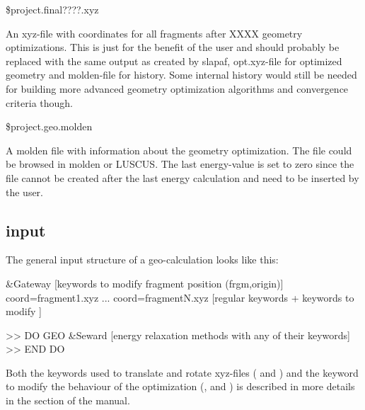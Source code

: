 \begin{filelist}
\item[\$project.final????.xyz]

An xyz-file with coordinates for all fragments after XXXX geometry optimizations.
 This is just for the benefit of the user and should probably be replaced with the
 same output as created by slapaf, opt.xyz-file for optimized geometry and molden-file
 for history. Some internal history would still be needed for building more advanced
 geometry optimization algorithms and convergence criteria though.

\item[\$project.geo.molden]

A molden file with information about the geometry optimization.
 The file could be browsed in molden or LUSCUS. The last
 energy-value is set to zero since the file cannot be created
 after the last energy calculation and need to be inserted by the user. 
\end{filelist}

\subsection{input}
\label{UG:sec:Geo_input}
The general input structure of a geo-calculation looks like this:
\begin{sourcelisting}
&Gateway
[keywords to modify fragment position (frgm,origin)]
coord=fragment1.xyz
...
coord=fragmentN.xyz
[regular  keywords + keywords to modify ]

>> DO GEO
 &Seward
[energy relaxation methods with any of their keywords]
>> END DO
\end{sourcelisting}

Both the keywords used to translate and rotate xyz-files (
 and ) and the keyword to modify the behaviour of the optimization
(, and ) is
described in more details in the  section of the manual.

